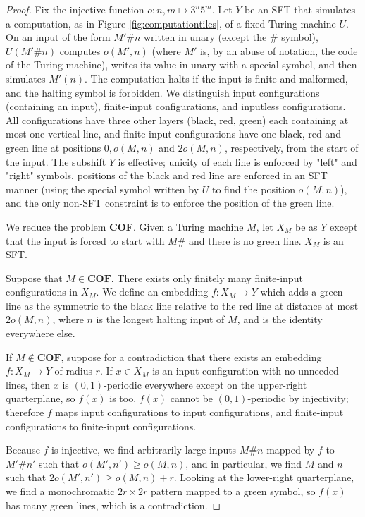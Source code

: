 \documentclass[a4paper]{article}
\theoremstyle{definition}
\begin{document}
\begin{proof}
    Fix the injective function $o: n,m \mapsto 3^n 5^m$.
    Let $Y$ be an SFT that simulates a computation, as in Figure \ref{fig:computationtiles}, of a fixed Turing machine $U$. On an input of the form $M'\#n$ written in unary (except the $\#$ symbol), $U(M'\#n)$ computes $o(M',n)$ (where $M'$ is, by an abuse of notation, the code of the Turing machine), writes its value in unary with a special symbol, and then simulates $M'(n)$. The computation halts if the input is finite and malformed, and the halting symbol is forbidden. We distinguish input configurations (containing an input), finite-input configurations, and inputless configurations.
    All configurations have three other layers (black, red, green) each containing at most one vertical line, and finite-input configurations have one black, red and green line at positions $0, o(M,n)$ and $2o(M,n)$, respectively, from the start of the input. 
    The subshift $Y$ is effective; unicity of each line is enforced by "left" and "right" symbols, positions of the black and red line are enforced in an SFT manner (using the special symbol written by $U$ to find the position $o(M,n)$), and the only non-SFT constraint is to enforce the position of the green line. 

    We reduce the problem \textbf{COF}. Given a Turing machine $M$, let $X_M$ be as $Y$ except that the input is forced to start with $M\#$ and there is no green line. $X_M$ is an SFT.

    Suppose that $M \in \textbf{COF}$. There exists only finitely many finite-input configurations in $X_M$. We define an embedding $f:X_M \to Y$ which adds a green line as the symmetric to the black line relative to the red line at distance at most $2o(M,n)$, where $n$ is the longest halting input of $M$, and is the identity everywhere else.
    
    If $M \notin \textbf{COF}$, suppose for a contradiction that there exists an embedding $f:X_M \to Y$ of radius $r$. If $x \in X_M$ is an input configuration with no unneeded lines, then $x$ is $(0,1)$-periodic everywhere except on the upper-right quarterplane, so $f(x)$ is too. $f(x)$ cannot be $(0,1)$-periodic by injectivity; therefore $f$ maps input configurations to input configurations, and finite-input configurations to finite-input configurations. 

    Because $f$ is injective, we find arbitrarily large inputs $M\#n$ mapped by $f$ to $M'\#n'$ such that $o(M', n') \geq o(M,n)$, and in particular, we find $M$ and $n$ such that $2o(M', n') \geq o(M,n) + r$. Looking at the lower-right quarterplane, we find a monochromatic $2r \times 2r$ pattern mapped to a green symbol, so $f(x)$ has many green lines, which is a contradiction.
\end{proof}
\end{document}
